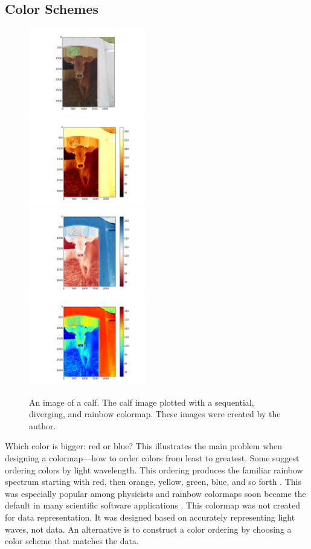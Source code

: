 \documentclass[journal,12pt]{IEEEtran}
\begin{document}
\subsection{Color Schemes}

\begin{figure}
\centering
\includegraphics[width=2in]{calf_original} \\
\includegraphics[width=2in]{calf_sequential} \\
\includegraphics[width=2in]{calf_diverging} \\
\includegraphics[width=2in]{calf_rainbow} \\
\caption{An image of a calf. The calf image plotted with a
sequential, diverging, and rainbow colormap. These images were created by the author.}
\end{figure}

Which color is bigger: red or blue? This illustrates the main problem
when designing a colormap---how to order colors
from least to greatest. Some suggest
ordering colors by light wavelength. 
This ordering produces the familiar rainbow spectrum
starting with red, then orange,
yellow, green, blue, and so forth \cite{colormapping}.
This was especially popular among physicists and rainbow colormaps soon became the default
in many scientific software applications \cite{rainbowstill,matlab}.
This colormap was not created for data representation. It was designed based
on accurately representing light waves, not data.
An alternative is to construct a color ordering by choosing a color scheme that matches the data.
\end{document}
